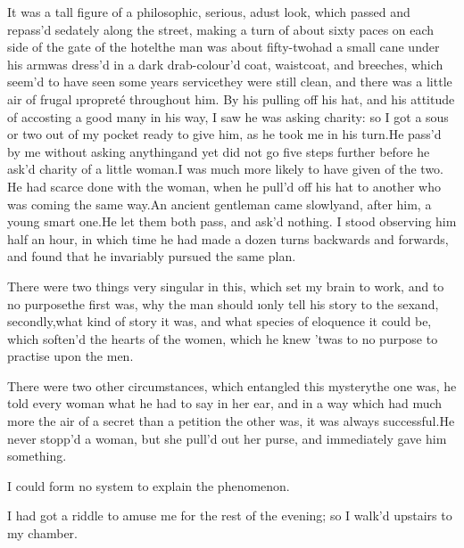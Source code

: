 \documentclass[twoside]{article}
\begin{document}
It was a tall figure of a philosophic,
serious, adust look, which passed and
repass’d sedately along the street, making
a turn of about sixty paces on each side
of the gate of the hotel\tskk the man was
about fifty-two\tskk had a small cane
under his arm\tskk was dress’d in a dark
drab-colour’d coat, waistcoat, and
breeches, which seem’d to have seen some
years service\tskk they were still clean,
and there was a little air of frugal
\i{propreté} throughout him.  By his
pulling off his hat, and his attitude of
accosting a good many in his way, I saw he
was asking charity: so I got a sous or two
out of my pocket ready to give him, as he
took me in his turn.\tskk He pass’d by me
without asking anything\tskk and yet did
not go five steps further before he ask’d
charity of a little woman.\tskk I was much
more likely to have given of the two.\tskk
He had scarce done with the woman, when he
pull’d off his hat to another who was
coming the same way.\tskk An ancient
gentleman came slowly\tskk and, after him,
a young smart one.\tskk He let them both
pass, and ask’d nothing.  I stood
observing him half an hour, in which time
he had made a dozen turns backwards and
forwards, and found that he invariably
pursued the same plan.

There were two things very singular in
this, which set my brain to work, and to
no purpose\tskk the first was, why the
man should \i{only} tell his story to the
sex\tskk and, secondly,\tskk what kind of
story it was, and what species of
eloquence it could be, which soften’d the
hearts of the women, which he knew ’twas
to no purpose to practise upon the men.

There were two other circumstances, which
entangled this mystery\tskk the one was,
he told every woman what he had to say in
her ear, and in a way which had much more
the air of a secret than a petition\tskk
the other was, it was always
successful.\tskk He never stopp’d a woman,
but she pull’d out her purse, and
immediately gave him something.

I could form no system to explain the
phenomenon.

I had got a riddle to amuse me for the
rest of the evening; so I walk’d upstairs
to my chamber.





\vskip 6pt
\end{document}
